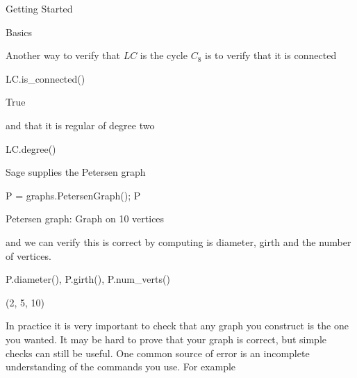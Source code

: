 \begin{chap}{Getting Started}
\begin{sect}{Basics}
\begin{para}
Another way to verify that $LC$ is the cycle $C_8$ is to verify that it
is connected
\end{para}
%
\begin{sagecode}
\begin{sageinput}
LC.is_connected()
\end{sageinput}
\begin{sageoutput}
True
\end{sageoutput}
\end{sagecode}
%
\begin{para}
and that it is regular of degree two
\end{para}
%
\begin{sagecode}
\begin{sageinput}
LC.degree()
\end{sageinput}
\begin{sageoutput}
[2, 2, 2, 2, 2, 2, 2, 2]
\end{sageoutput}
\end{sagecode}
%
\begin{para}
Sage supplies the Petersen graph
\end{para}
%
\begin{sagecode}
\begin{sageinput}
P = graphs.PetersenGraph(); P
\end{sageinput}
\begin{sageoutput}
Petersen graph: Graph on 10 vertices
\end{sageoutput}
\end{sagecode}
%
\begin{para}
and we can verify this is correct by computing is diameter, girth
and the number of vertices.
\end{para}
%
\begin{sagecode}
\begin{sageinput}
P.diameter(), P.girth(), P.num_verts()
\end{sageinput}
\begin{sageoutput}
(2, 5, 10)   
\end{sageoutput}
\end{sagecode}
%
\begin{para}
In practice it is very important to check that any graph you construct is
the one you wanted.  It may be hard to prove that your graph is correct,
but simple checks can still be useful. One common source of error is an incomplete
understanding of the commands you use.  For example
\end{para}
%
\begin{sagecode}

\end{sagecode}
\end{sect}
\end{chap}
